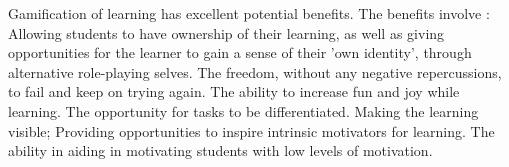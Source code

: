 		Gamification of learning has excellent potential benefits. The benefits involve \cite{gamelearning}: Allowing students to have ownership of their learning, as well as giving opportunities for the learner to gain a sense of their 'own identity', through alternative role-playing selves. The freedom, without any negative repercussions, to fail and keep on trying again. The ability to increase fun and joy while learning. The opportunity for tasks to be differentiated. Making the learning visible; Providing opportunities to inspire intrinsic motivators for learning. The ability in aiding in motivating students with low levels of motivation.
		
		